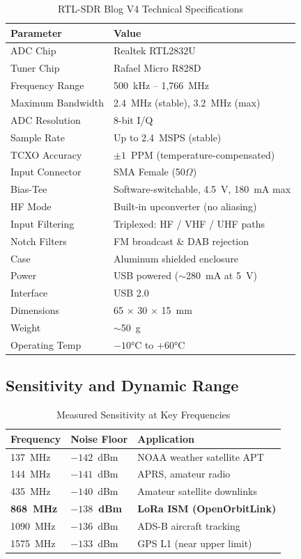\documentclass[12pt,a4paper]{article}
\begin{document}
\begin{table}[h!]
\centering
\caption{RTL-SDR Blog V4 Technical Specifications}
\begin{tabular}{@{}ll@{}}
\toprule
\textbf{Parameter} & \textbf{Value} \\
\midrule
ADC Chip & Realtek RTL2832U \\
Tuner Chip & Rafael Micro R828D \\
Frequency Range & 500~kHz -- 1,766~MHz \\
Maximum Bandwidth & 2.4~MHz (stable), 3.2~MHz (max) \\
ADC Resolution & 8-bit I/Q \\
Sample Rate & Up to 2.4~MSPS (stable) \\
TCXO Accuracy & $\pm 1$~PPM (temperature-compensated) \\
Input Connector & SMA Female (50$\Omega$) \\
Bias-Tee & Software-switchable, 4.5~V, 180~mA max \\
HF Mode & Built-in upconverter (no aliasing) \\
Input Filtering & Triplexed: HF / VHF / UHF paths \\
Notch Filters & FM broadcast \& DAB rejection \\
Case & Aluminum shielded enclosure \\
Power & USB powered ($\sim$280~mA at 5~V) \\
Interface & USB 2.0 \\
Dimensions & 65 $\times$ 30 $\times$ 15~mm \\
Weight & $\sim$50~g \\
Operating Temp & $-10°$C to $+60°$C \\
\bottomrule
\end{tabular}
\end{table}

\subsection{Sensitivity and Dynamic Range}

\begin{table}[h!]
\centering
\caption{Measured Sensitivity at Key Frequencies}
\begin{tabular}{@{}lll@{}}
\toprule
\textbf{Frequency} & \textbf{Noise Floor} & \textbf{Application} \\
\midrule
137~MHz & $-142$~dBm & NOAA weather satellite APT \\
144~MHz & $-141$~dBm & APRS, amateur radio \\
435~MHz & $-140$~dBm & Amateur satellite downlinks \\
\textbf{868~MHz} & \textbf{$-138$~dBm} & \textbf{LoRa ISM (OpenOrbitLink)} \\
1090~MHz & $-136$~dBm & ADS-B aircraft tracking \\
1575~MHz & $-133$~dBm & GPS L1 (near upper limit) \\
\bottomrule
\end{tabular}
\end{table}
\end{document}
